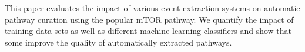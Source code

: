 This paper evaluates the impact of various event extraction systems on automatic pathway curation using the popular mTOR pathway. We quantify the impact of training data sets as well as different machine learning classifiers and show that some improve the quality of automatically extracted pathways.
